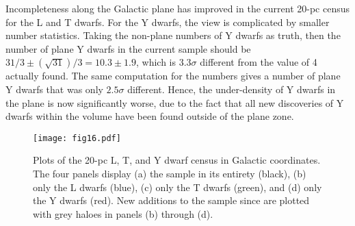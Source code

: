 \documentclass[twocolumn,tighten,twocolappendix]{aastex631}
\begin{document}
Incompleteness along the Galactic plane has improved in the current 20-pc census for the L and T dwarfs. For the Y dwarfs, the view is complicated by smaller number statistics. Taking the non-plane numbers of Y dwarfs as truth, then the number of plane Y dwarfs in the current sample should be $31/3 \pm (\sqrt{31})/3 = 10.3 \pm 1.9$, which is $3.3\sigma$ different from the value of 4 actually found. The same computation for the \cite{kirkpatrick2021} numbers gives a number of plane Y dwarfs that was only $2.5\sigma$ different. Hence, the under-density of Y dwarfs in the plane is now significantly worse, due to the fact that all new discoveries of Y dwarfs within the volume have been found outside of the plane zone.

\begin{figure*}
\texttt{[image: fig16.pdf]}
\caption{Plots of the 20-pc L, T, and Y dwarf census in Galactic coordinates. The four panels display (a) the sample in its entirety (black), (b) only the L dwarfs (blue), (c) only the T dwarfs (green), and (d) only the Y dwarfs (red). New additions to the sample since \cite{kirkpatrick2021} are plotted with grey haloes in panels (b) through (d).
\label{fig:brown_dwarf_census_sky_plots}}
\end{figure*}
\end{document}
